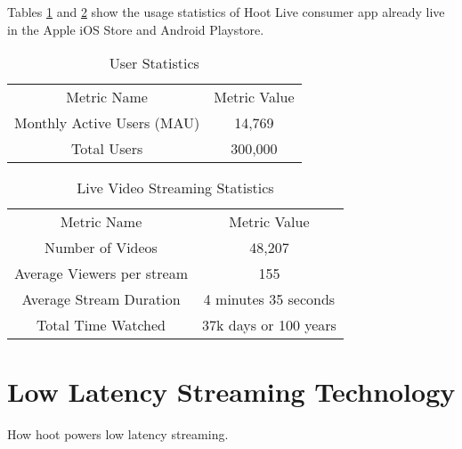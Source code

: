 \documentclass{article}
\begin{document}

Tables \ref{table:1} and \ref{table:2} show the usage statistics of Hoot Live consumer app already live in the Apple iOS Store and Android Playstore.

\setlength{\arrayrulewidth}{1mm}
\setlength{\tabcolsep}{18pt}
\renewcommand{\arraystretch}{2.5} 
 


\begin{table}[!htb]
\centering
\begin{tabular}{ |c|c| }
\hline
\rowcolor{lightgray} \multicolumn{2}{|c|}{User Statistics} \\
\hline
Metric Name & Metric Value  \\
\hline
Monthly Active Users (MAU) & 14,769 \\
Total Users & 300,000  \\
\hline
\end{tabular}
\caption{User Statistics}
\label{table:1}
\end{table}

\begin{table}[!htb]
\centering
\begin{tabular}{ |c|c| }
\hline
\rowcolor{lightgray} \multicolumn{2}{|c|}{Live Video Streaming Statistics} \\
\hline
Metric Name & Metric Value  \\
\hline
Number of Videos & 48,207 \\
Average Viewers per stream & 155 \\
Average Stream Duration & 4 minutes 35 seconds \\
Total Time Watched & 37k days or 100 years \\
\hline
\end{tabular}
\caption{Live Video Streaming Statistics}
\label{table:2}
\end{table}



\section{Low Latency Streaming Technology}
How hoot powers low latency streaming.


\end{document}
